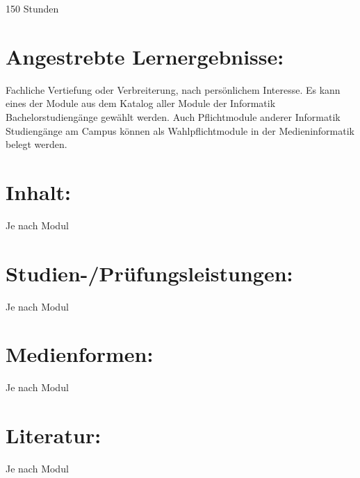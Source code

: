 150 Stunden

\section{Angestrebte
Lernergebnisse:}\label{angestrebte-lernergebnisse-32}

Fachliche Vertiefung oder Verbreiterung, nach persönlichem Interesse. Es
kann eines der Module aus dem Katalog aller Module der Informatik
Bachelorstudiengänge gewählt werden. Auch Pflichtmodule anderer
Informatik Studiengänge am Campus können als Wahlpflichtmodule in der
Medieninformatik belegt werden.

\section{Inhalt:}\label{inhalt-32}

Je nach Modul

\section{Studien-/Prüfungsleistungen:}\label{studien-pruxfcfungsleistungen-32}

Je nach Modul

\section{Medienformen:}\label{medienformen-32}

Je nach Modul

\section{Literatur:}\label{literatur-32}

Je nach Modul
